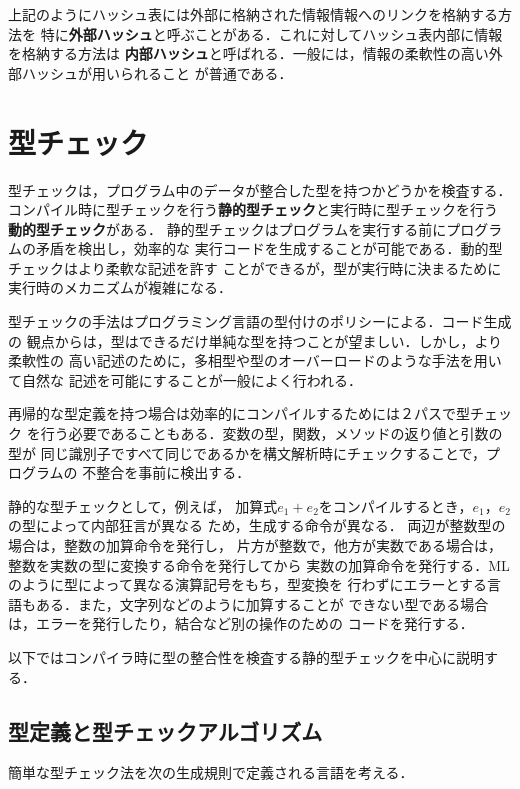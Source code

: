 \documentclass[a4j,dvipdfmx]{jbook}
\begin{document}
上記のようにハッシュ表には外部に格納された情報情報へのリンクを格納する方法を
特に{\bf 外部ハッシュ}と呼ぶことがある．これに対してハッシュ表内部に情報を格納する方法は
{\bf 内部ハッシュ}と呼ばれる．一般には，情報の柔軟性の高い外部ハッシュが用いられること
が普通である．



\section{型チェック}

型チェックは，プログラム中のデータが整合した型を持つかどうかを検査する．
コンパイル時に型チェックを行う{\bf 静的型チェック}と実行時に型チェックを行う
{\bf 動的型チェック}がある．
静的型チェックはプログラムを実行する前にプログラムの矛盾を検出し，効率的な
実行コードを生成することが可能である．動的型チェックはより柔軟な記述を許す
ことができるが，型が実行時に決まるために実行時のメカニズムが複雑になる．

型チェックの手法はプログラミング言語の型付けのポリシーによる．コード生成の
観点からは，型はできるだけ単純な型を持つことが望ましい．しかし，より柔軟性の
高い記述のために，多相型や型のオーバーロードのような手法を用いて自然な
記述を可能にすることが一般によく行われる．

再帰的な型定義を持つ場合は効率的にコンパイルするためには２パスで型チェック
を行う必要であることもある．変数の型，関数，メソッドの返り値と引数の型が
同じ識別子ですべて同じであるかを構文解析時にチェックすることで，プログラムの
不整合を事前に検出する．

静的な型チェックとして，例えば，
加算式$e_1+e_2$をコンパイルするとき，$e_1$，$e_2$の型によって内部狂言が異なる
ため，生成する命令が異なる．
両辺が整数型の場合は，整数の加算命令を発行し，
片方が整数で，他方が実数である場合は，整数を実数の型に変換する命令を発行してから
実数の加算命令を発行する．MLのように型によって異なる演算記号をもち，型変換を
行わずにエラーとする言語もある．また，文字列などのように加算することが
できない型である場合は，エラーを発行したり，結合など別の操作のための
コードを発行する．

以下ではコンパイラ時に型の整合性を検査する静的型チェックを中心に説明する．

\subsection{型定義と型チェックアルゴリズム}

簡単な型チェック法を次の生成規則で定義される言語を考える．
\end{document}
